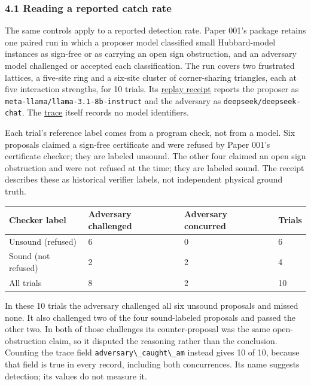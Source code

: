 \documentclass[
  11pt,
]{article}
\newcommand{\passthrough}[1]{#1}
\begin{document}
\hypertarget{reading-a-reported-catch-rate}{%
\subsubsection{4.1 Reading a reported catch
rate}\label{reading-a-reported-catch-rate}}

The same controls apply to a reported detection rate. Paper 001's
package retains one paired run in which a proposer model classified
small Hubbard-model instances as sign-free or as carrying an open sign
obstruction, and an adversary model challenged or accepted each
classification. The run covers two frustrated lattices, a five-site ring
and a six-site cluster of corner-sharing triangles, each at five
interaction strengths, for 10 trials. Its
\href{https://github.com/dbccpage/the_symbol_game/blob/593230f7daba7aa04d7c41dd456dfbd00a39bcbd/atlas/coda_atlas/symbol_game/001_pfp_discrete_cochain_retraction_and_toy_involutions/results/demo2_r7_adversarial_debate_receipt.json}{replay
receipt} reports the proposer as
\passthrough{\lstinline!meta-llama/llama-3.1-8b-instruct!} and the
adversary as \passthrough{\lstinline!deepseek/deepseek-chat!}. The
\href{https://github.com/dbccpage/the_symbol_game/blob/593230f7daba7aa04d7c41dd456dfbd00a39bcbd/atlas/coda_atlas/symbol_game/001_pfp_discrete_cochain_retraction_and_toy_involutions/results/demo2_r7_adversarial_debate_1790210039.jsonl}{trace}
itself records no model identifiers.

Each trial's reference label comes from a program check, not from a
model. Six proposals claimed a sign-free certificate and were refused by
Paper 001's certificate checker; they are labeled unsound. The other
four claimed an open sign obstruction and were not refused at the time;
they are labeled sound. The receipt describes these as historical
verifier labels, not independent physical ground truth.

\begin{longtable}[]{@{}llll@{}}
\toprule\noalign{}
Checker label & Adversary challenged & Adversary concurred & Trials \\
\midrule\noalign{}
\endhead
\bottomrule\noalign{}
\endlastfoot
Unsound (refused) & 6 & 0 & 6 \\
Sound (not refused) & 2 & 2 & 4 \\
All trials & 8 & 2 & 10 \\
\end{longtable}

In these 10 trials the adversary challenged all six unsound proposals
and missed none. It also challenged two of the four sound-labeled
proposals and passed the other two. In both of those challenges its
counter-proposal was the same open-obstruction claim, so it disputed the
reasoning rather than the conclusion. Counting the trace field
\passthrough{\lstinline!adversary\_caught\_am!} instead gives 10 of 10,
because that field is true in every record, including both concurrences.
Its name suggests detection; its values do not measure it.
\end{document}
